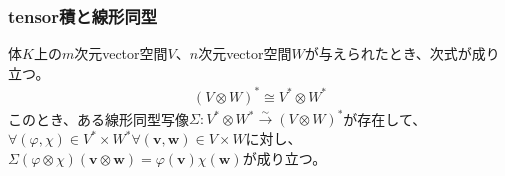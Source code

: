 \documentclass[dvipdfmx]{jsarticle}
\begin{document}
\subsubsection{tensor積と線形同型}%
\begin{thm}\label{2.4.5.14}
体$K$上の$m$次元vector空間$V$、$n$次元vector空間$W$が与えられたとき、次式が成り立つ。
\begin{align*}
(V \otimes W)^{*} \cong V^{*} \otimes W^{*}
\end{align*}
このとき、ある線形同型写像$\varSigma:V^{*} \otimes W^{*}\overset{\sim}{\rightarrow}(V \otimes W)^{*}$が存在して、$\forall(\varphi,\chi) \in V^{*} \times W^{*}\forall\left( \mathbf{v},\mathbf{w} \right) \in V \times W$に対し、$\varSigma(\varphi \otimes \chi)\left( \mathbf{v} \otimes \mathbf{w} \right) = \varphi\left( \mathbf{v} \right)\chi\left( \mathbf{w} \right)$が成り立つ。
\end{thm}
\end{document}
